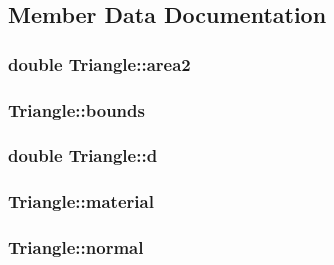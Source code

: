 \subsection{Member Data Documentation}
\subsubsection[{\texorpdfstring{area2}{area2}}]{\setlength{\rightskip}{0pt plus 5cm}double Triangle\+::area2\hspace{0.3cm}{\ttfamily [private]}}\hypertarget{classTriangle_a43322fb75910877dd63b17d391e3022b}{}\label{classTriangle_a43322fb75910877dd63b17d391e3022b}
\subsubsection[{\texorpdfstring{bounds}{bounds}}]{ Triangle\+::bounds\hspace{0.3cm}{\ttfamily [private]}}\hypertarget{classTriangle_ac5b18fe5f9ea12fb717e3306c300527d}{}\label{classTriangle_ac5b18fe5f9ea12fb717e3306c300527d}
\subsubsection[{\texorpdfstring{d}{d}}]{\setlength{\rightskip}{0pt plus 5cm}double Triangle\+::d\hspace{0.3cm}{\ttfamily [private]}}\hypertarget{classTriangle_a0cb5b18a8ce2cf896712cd3f9e6c80ea}{}\label{classTriangle_a0cb5b18a8ce2cf896712cd3f9e6c80ea}
\subsubsection[{\texorpdfstring{material}{material}}]{ Triangle\+::material\hspace{0.3cm}{\ttfamily [private]}}\hypertarget{classTriangle_ae170999b9b35d778d9a0d084d256547b}{}\label{classTriangle_ae170999b9b35d778d9a0d084d256547b}
\subsubsection[{\texorpdfstring{normal}{normal}}]{ Triangle\+::normal\hspace{0.3cm}{\ttfamily [private]}}\hypertarget{classTriangle_ac6e29ae9d1f7abc16cfb25357c74806f}{}\label{classTriangle_ac6e29ae9d1f7abc16cfb25357c74806f}
